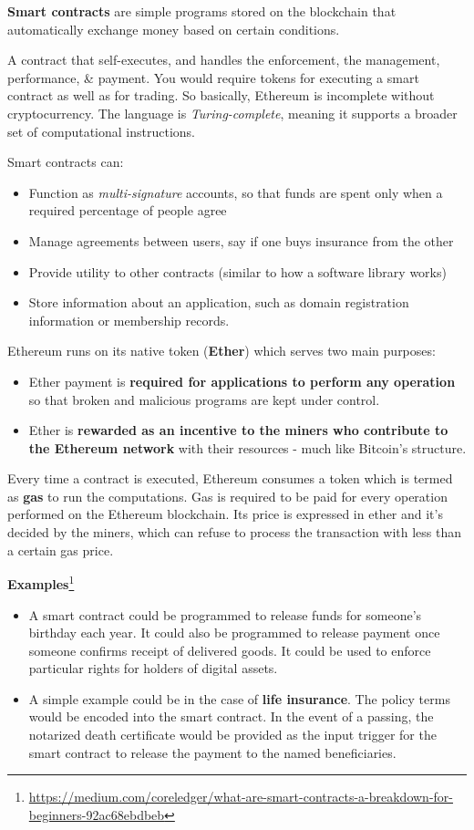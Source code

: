 \textbf{Smart contracts} are simple programs stored on the blockchain that automatically exchange money based on certain conditions.

A contract that self-executes, and handles the enforcement, the management, performance, \& payment. You would require tokens for executing a smart contract as well as for trading. So basically, Ethereum is incomplete without cryptocurrency. The language is \textit{Turing-complete}, meaning it supports a broader set of computational instructions.

Smart contracts can:
\begin{itemize}
	\item Function as \textit{multi-signature} accounts, so that funds are spent only when a required percentage of people agree
	\item Manage agreements between users, say if one buys insurance from the other
	\item Provide utility to other contracts (similar to how a software library works)
	\item Store information about an application, such as domain registration information or membership records.
\end{itemize}

Ethereum runs on its native token (\textbf{Ether}) which serves two main purposes:
\begin{itemize}
	\item Ether payment is \textbf{required for applications to perform any operation} so that broken and malicious programs are kept under control.
	\item Ether is \textbf{rewarded as an incentive to the miners who contribute to the Ethereum network} with their resources - much like Bitcoin’s structure.
\end{itemize}

Every time a contract is executed, Ethereum consumes a token which is termed as \textbf{gas} to run the computations. Gas is required to be paid for every operation performed on the Ethereum blockchain. Its price is expressed in ether and it’s decided by the miners, which can refuse to process the transaction with less than a certain gas price.

\textbf{Examples}\footnote{\url{https://medium.com/coreledger/what-are-smart-contracts-a-breakdown-for-beginners-92ac68ebdbeb}}
\begin{itemize}
	\item A smart contract could be programmed to release funds for someone’s birthday each year. It could also be programmed to release payment once someone confirms receipt of delivered goods. It could be used to enforce particular rights for holders of digital assets.
	\item A simple example could be in the case of \textbf{life insurance}. The policy terms would be encoded into the smart contract. In the event of a passing, the notarized death certificate would be provided as the input trigger for the smart contract to release the payment to the named beneficiaries.
\end{itemize}
